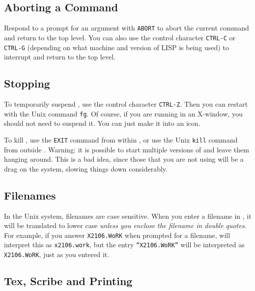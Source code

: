 \documentclass{article}
\begin{document}
\subsection{Aborting a Command}

Respond to a prompt for an argument with {\tt ABORT} to abort the current
command and return to the top level.  You can also use the control character
{\tt CTRL-C} or {\tt CTRL-G} (depending on what machine and version of LISP is
being used) to interrupt {\ETPS} and return to the top level.

\subsection{Stopping {\ETPS}}

To temporarily suspend {\ETPS}, use the control character {\tt CTRL-Z}.  Then
you can restart {\ETPS} with the  Unix command {\tt fg}.  Of course, if you
are running {\ETPS} in an X-window, you should not need to suspend it. You
can just make it into an icon.

To kill {\ETPS}, use the {\tt EXIT} command from within {\ETPS}, or use
the Unix {\tt kill} command from outside {\ETPS}.
Warning:  it is possible to start
multiple versions of {\ETPS} and leave them hanging around.
This is a bad idea, since those that
you are not using will be a drag on the system, slowing things down
considerably.



\subsection{Filenames}

In the Unix system, filenames are case sensitive.  When
you enter a filename in {\ETPS}, it will be translated to lower case
{\it unless you enclose the filename in double quotes}.  For example, if
you answer {\tt X2106.WoRK} when prompted for a filename, {\ETPS} will interpret
this as {\tt x2106.work}, but the entry {\tt ``X2106.WoRK''} will be interpreted
as {\tt X2106.WoRK}, just as you entered it.



\subsection{Tex, Scribe and Printing}
\end{document}
